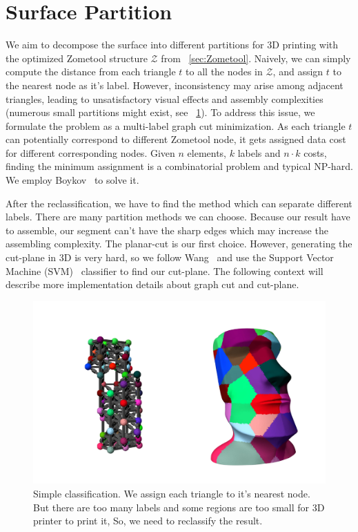 \section{Surface Partition}
\label{sec:surf_part}

We aim to decompose the surface into different partitions for 3D printing with the optimized Zometool structure $\mathcal{Z}$ from \secname~\ref{sec:Zometool}.
Naively, we can simply compute the distance from each triangle $t$ to all the nodes in $\mathcal{Z}$, and assign $t$ to the nearest node as it's label.
However, inconsistency may arise among adjacent triangles,  leading to unsatisfactory visual effects and assembly complexities (numerous small partitions might exist, see \figname~\ref{fig:nearest}). 
To address this issue, we formulate the problem as a multi-label graph cut minimization.
As each triangle $t$ can potentially correspond to different Zometool node, it gets assigned data cost for different corresponding nodes.
Given $n$ elements, $k$ labels and $n\cdot k$ costs, finding the minimum assignment is a combinatorial problem and typical NP-hard.
We employ Boykov~\cite{boykov:2004:experimental} to solve it. \par
After the reclassification, we have to find the method which can separate different labels. There are many partition methods we can choose. Because our result have to assemble, our segment can't have the sharp edges which may increase the assembling complexity. The planar-cut is our first choice. However, generating the cut-plane in 3{D} is very hard, so we follow Wang~\cite{wang2016improved} and use the Support Vector Machine (SVM)~\cite{cortes1995support} classifier to find our cut-plane. The following context will describe more implementation details about graph cut and cut-plane.

\begin{figure}[ht]
\centering
\includegraphics[width=1.0\linewidth]{figs/nearest_node.pdf} 
\caption{Simple classification. We assign each triangle to it's nearest node. But there are too many labels and some regions are too small for 3D printer to print it, So, we need to reclassify the result.}
\label{fig:nearest}
\end{figure}

